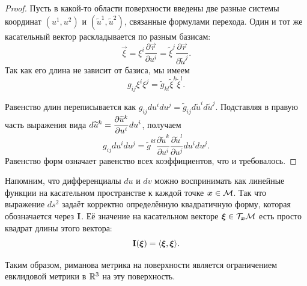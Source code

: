 \begin{proof}
	Пусть в какой-то области поверхности введены две разные системы координат $(u^1, u^2)$ и $(\widetilde{u}^1, \widetilde{u}^2)$, связанные формулами перехода. Один и тот же касательный вектор раскладывается по разным базисам:
	\[
		\vec{\xi} = \xi^i\frac{\partial\vec{r}}{\partial u^i} = \widetilde{\xi}^j\frac{\partial\vec{r}}{\partial\widetilde{u}^j}.
	\]
	Так как его длина не зависит от базиса, мы имеем
	\[
		g_{ij}\xi^i\xi^j = \widetilde{g}_{kl}\widetilde{\xi}^k\widetilde{\xi}^l.
	\]

	Равенство длин переписывается как $g_{ij}du^idu^j = \widetilde{g}_{ij}d\widetilde{u}^id\widetilde{u}^j$. Подставляя в правую часть выражения вида $\displaystyle d\widetilde{u}^k = \frac{\partial\widetilde{u}^k}{\partial u^i}du^i$, получаем
	\[
		g_{ij}du^idu^j = \widetilde{g}^{kl}\frac{\partial\widetilde{u}^k}{\partial u^i}\frac{\partial\widetilde{u}^l}{\partial u^j}du^idu^j.
	\]
	Равенство форм означает равенство всех коэффициентов, что и требовалось.
\end{proof}

Напомним, что дифференциалы $du$ и $dv$ можно воспринимать как линейные функции на касательном пространстве к каждой точке $\boldsymbol{x} \in \mathcal{M}$. Так что выражение $ds^2$ задаёт корректно определённую квадратичную форму, которая обозначается через $\boldsymbol{\operatorname{I}}$. Её значение на касательном векторе $\boldsymbol{\xi} \in \mathcal{T}_{\boldsymbol{x}}\mathcal{M}$ есть просто квадрат длины этого вектора:
\[
	\boldsymbol{\operatorname{I}}(\boldsymbol{\xi}) = \langle\boldsymbol{\xi}, \boldsymbol{\xi}\rangle.
\]

Таким образом, риманова метрика на поверхности является ограничением евклидовой метрики в $\mathbb{R}^3$ на эту поверхность.

